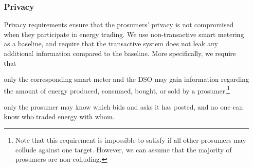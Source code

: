 \subsubsection{Privacy} 
Privacy requirements ensure that the prosumers' privacy is not compromised when they participate in energy trading.
We use non-transactive smart metering as a baseline, and require that the transactive system does not leak any additional information compared to the baseline.
More specifically, we require that
\begin{compactitem}
\item only the corresponding smart meter and the DSO may gain information regarding the amount of energy produced, consumed, bought, or sold by a prosumer,\footnote{Note that this requirement is impossible to satisfy if all other prosumers may collude against one target. However, we can assume that the majority of prosumers are non-colluding.}
\item only the prosumer may know which bids and asks it has posted, and no one can know who traded energy with whom.
\end{compactitem}


